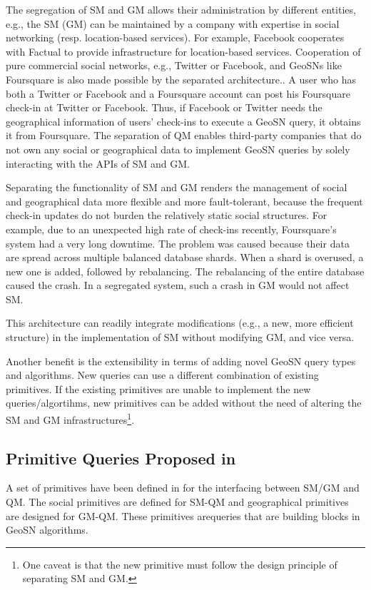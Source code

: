 The segregation of SM and GM allows their administration by different entities, e.g., the SM (GM) can be maintained by a company with expertise in social networking (resp. location-based services)\cite{gen, factual}. For example, Facebook cooperates with Factual to provide infrastructure for location-based services. Cooperation of pure commercial social networks, e.g., Twitter or Facebook, and GeoSNs like Foursquare is also made possible by the separated architecture.. A user who has both a Twitter or Facebook and a Foursquare account can post his Foursquare check-in at Twitter or Facebook. Thus, if Facebook or Twitter needs the geographical information of users’ check-ins to execute a GeoSN query, it obtains it from Foursquare. The separation of QM enables third-party companies that do not own any social or geographical data to implement GeoSN queries by solely interacting with the APIs of SM and GM.

Separating the functionality of SM and GM renders the management of social and geographical data more flexible and more fault-tolerant, because the frequent check-in updates do not burden the relatively static social structures. 
For example, due to an unexpected high rate of check-ins recently, Foursquare’s system had a very long downtime. The problem was caused because their data are spread across multiple balanced database shards. When a shard is overused, a new one is added, followed by rebalancing. The rebalancing of the entire database caused the crash. In a segregated system, such a crash in GM would not affect SM.

This architecture can readily integrate modifications (e.g., a new, more efficient structure) in the implementation of SM without modifying GM, and vice versa. 

Another benefit is the extensibility in terms of adding novel GeoSN query types and algorithms. New queries can use a different combination of existing primitives. If the existing primitives are unable to implement the new queries/algortihms, new primitives can be added without the need of altering the SM and GM infrastructures\footnote{One caveat is that the new primitive must follow the design principle of separating SM and GM.}.

\subsection{Primitive Queries Proposed in \cite{armenatzoglou2013general}}
A set of primitives have been defined in \cite{armenatzoglou2013general} for the interfacing between SM/GM and QM. The social primitives are defined for SM-QM and geographical primitives are designed for GM-QM. These primitives arequeries that are building blocks in GeoSN algorithms. 

